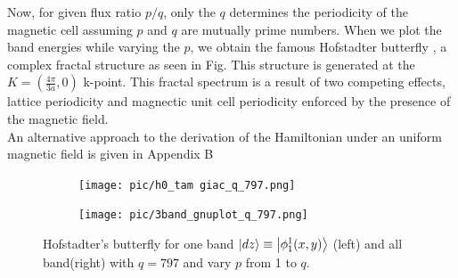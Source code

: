 \documentclass{report}
\begin{document}
Now, for given flux ratio $p/q$, only the $q$ determines the periodicity of the magnetic cell assuming $p$ and $q$ are mutually prime numbers. When we plot the band energies while varying the $p$, we obtain the famous Hofstadter butterfly \cite{PhysRevB.14.2239}, a complex fractal structure as seen in Fig. This structure is generated at the $K = (\frac{4\pi}{3a},0)$ k-point. This fractal spectrum is a result of two competing effects, lattice periodicity and magnectic unit cell periodicity enforced by the presence of the magnetic field. \\
An alternative approach to the derivation of the Hamiltonian under an uniform magnetic field is given in Appendix B
\begin{figure}[htb]
	\centering
	\begin{subfigure}[b]{0.495\textwidth}
		\centering
		\texttt{[image: pic/h0\_tam giac\_q\_797.png]}
		\label{fig:3 band}
	\end{subfigure}
	\begin{subfigure}[b]{0.495\textwidth}
		\centering
		\texttt{[image: pic/3band\_gnuplot\_q\_797.png]}
		\label{fig:1 band}
	\end{subfigure}
	\caption{
		Hofstadter’s butterfly for one band $\ket{dz} \equiv \ket{\phi_{1}^{1}(x,y)}$ (left) and all band(right) with $q = 797$ and vary $p$  from 1 to $q$.  
	}
\end{figure}
\end{document}
